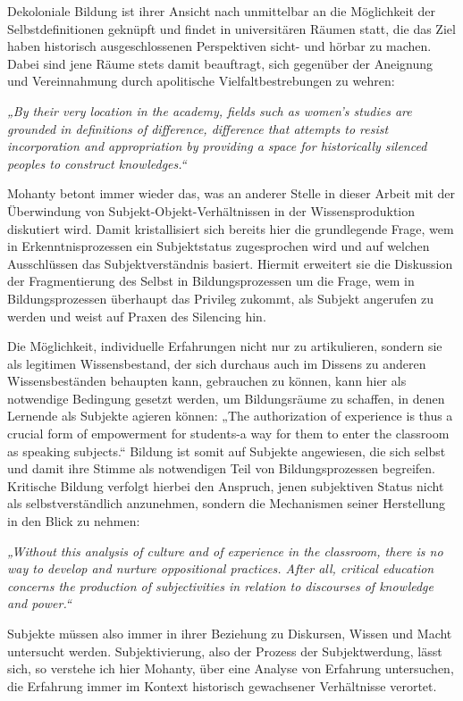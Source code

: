 \noindent Dekoloniale Bildung ist ihrer Ansicht nach unmittelbar an die Möglichkeit der
Selbstdefinitionen geknüpft und findet in universitären Räumen statt, die das
Ziel haben historisch ausgeschlossenen Perspektiven sicht- und hörbar zu
machen.\footnotemark{} Dabei sind jene Räume stets damit beauftragt, sich gegenüber der Aneignung und Vereinnahmung durch apolitische Vielfaltbestrebungen zu wehren:
\begin{myenv} 
  \textit{„By their very location in the academy, fields such
    as women's studies are grounded in definitions of difference, difference
    that attempts to resist incorporation and appropriation by providing a
    space for historically silenced peoples to construct
    knowledges.“\footnotemark{} } \end{myenv}
Mohanty betont immer wieder das, was an anderer Stelle in dieser Arbeit mit
der Überwindung von Subjekt-Objekt-Verhältnissen in der Wissensproduktion
diskutiert wird. Damit kristallisiert sich bereits hier die grundlegende
Frage, wem in Erkenntnisprozessen ein Subjektstatus zugesprochen wird und
auf welchen Ausschlüssen das Subjektverständnis basiert. Hiermit erweitert
sie die Diskussion der Fragmentierung des Selbst in Bildungsprozessen um
die Frage, wem in Bildungsprozessen überhaupt das Privileg zukommt, als
Subjekt angerufen zu werden und weist auf Praxen des Silencing hin.

\noindent Die Möglichkeit, individuelle Erfahrungen nicht nur zu artikulieren, sondern
sie als legitimen Wissensbestand, der sich durchaus auch im Dissens zu anderen
Wissensbeständen behaupten kann, gebrauchen zu können, kann hier als notwendige
Bedingung gesetzt werden, um Bildungsräume zu schaffen, in denen Lernende als
Subjekte agieren können: „The authorization of experience is thus a crucial
form of empowerment for students-a way for them to enter the classroom as
speaking subjects.“\footnotemark{} Bildung ist somit auf Subjekte angewiesen, die sich selbst
und damit ihre Stimme als notwendigen Teil von Bildungsprozessen begreifen.\\
Kritische Bildung verfolgt hierbei den Anspruch, jenen subjektiven Status nicht
als selbstverständlich anzunehmen, sondern die Mechanismen seiner Herstellung
in den Blick zu nehmen: 
\begin{myenv} 
  \textit{
„Without this analysis of culture and of experience in the classroom, there is no way to develop and nurture oppositional practices. After all, critical education concerns the production of subjectivities in relation to discourses of knowledge and power.“\footnotemark{} } \end{myenv}
Subjekte müssen also immer in ihrer Beziehung zu Diskursen, Wissen und Macht
untersucht werden. Subjektivierung, also der Prozess der Subjektwerdung, lässt
sich, so verstehe ich hier Mohanty, über eine Analyse von Erfahrung
untersuchen, die Erfahrung immer im Kontext historisch gewachsener Verhältnisse
verortet. \\


